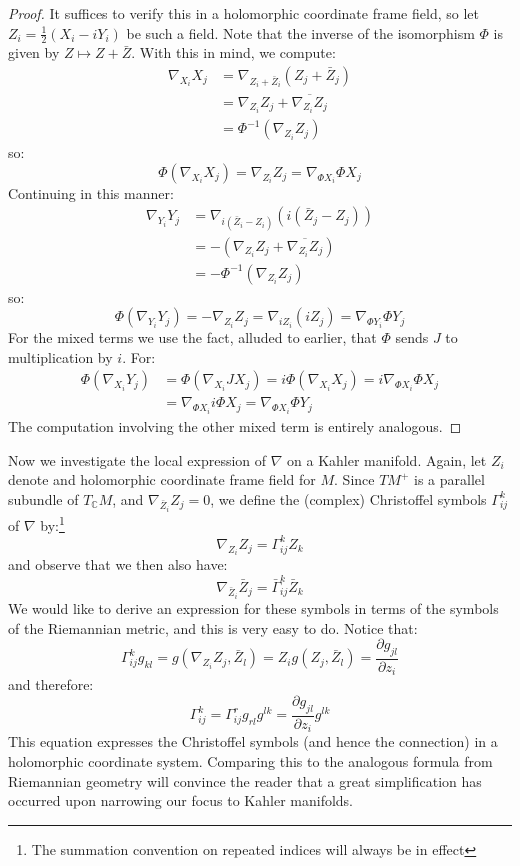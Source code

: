 \documentclass[11pt]{amsart}
\theoremstyle{definition}
\def \C{ \mathbb{C} }
\def \del{ \partial }
\begin{document}
\begin{proof}
%
It suffices to verify this in a holomorphic coordinate frame field, so let $Z_i = \frac{1}{2}(X_i - i Y_i)$ be such a field. Note that the inverse of the isomorphism $\Phi$ is given by $Z \mapsto Z + \bar{Z}$.  With this in mind, we compute:
%
\begin{align*}
\nabla_{X_i} X_j & = \nabla_{Z_i + \bar{Z}_i} ( Z_j + \bar{Z}_j ) \\
&= \nabla_{Z_i} Z_j + \overline{ \nabla_{Z_i} Z_j }\\
&= \Phi^{-1}( \nabla_{Z_i} Z_j )
\end{align*}
%
so:
%
$$ \Phi ( \nabla_{X_i} X_j ) = \nabla_{Z_i} Z_j = \nabla_{ \Phi X_i } \Phi X_j $$
%
Continuing in this manner:
%
\begin{align*}
\nabla_{Y_i} Y_j &= \nabla_{i(\bar{Z}_i - Z_i)} ( i(\bar{Z}_j - Z_j ) ) \\
&= - (\nabla_{Z_i} Z_j + \overline{ \nabla_{Z_i} Z_j } ) \\
&= - \Phi^{-1}( \nabla_{Z_i} Z_j ) 
\end{align*}
%
so:
%
$$ \Phi( \nabla_{Y_i} Y_j ) = -  \nabla_{Z_i} Z_j =  \nabla_{i Z_i}( i Z_j ) = \nabla_{ \Phi Y_i } \Phi Y_j $$
%
For the mixed terms we use the fact, alluded to earlier, that $\Phi$ sends $J$ to multiplication by $i$.  For:
%
\begin{align*}
\Phi( \nabla_{X_i} Y_j ) &= \Phi( \nabla_{X_i} J X_j ) = i \Phi( \nabla_{X_i} X_j ) = i \nabla_{\Phi X_i} \Phi X_j \\
&= \nabla_{\Phi X_i } i \Phi X_j = \nabla_{\Phi X_i} \Phi Y_j 
\end{align*}
%
The computation involving the other mixed term is entirely analogous. 
%
\end{proof}

Now we investigate the local expression of $\nabla$ on a Kahler manifold.  Again, let $Z_i$ denote and holomorphic coordinate frame field for $M$.  Since $TM^{+}$ is a parallel subundle of $T_{\C}M$, and $\nabla_{\bar{Z}_i} Z_j = 0$, we define the (complex) Christoffel symbols $\Gamma_{ij}^k$ of $\nabla$ by:\footnote{The summation convention on repeated indices will always be in effect}
%
$$ \nabla_{Z_i} Z_j = \Gamma_{ij}^k Z_k $$
%
and observe that we then also have:
%
$$ \nabla_{ \bar{Z}_i } \bar{Z}_j = \bar{\Gamma}_{ij}^k \bar{Z}_k $$
%
We would like to derive an expression for these symbols in terms of the symbols of the Riemannian metric, and this is very easy to do.  Notice that:
%
$$ \Gamma_{ij}^k g_{kl} = g( \nabla_{Z_i} Z_j, \bar{Z}_l ) = Z_i g( Z_j, \bar{Z}_l ) = \frac{ \del g_{jl} }{ \del z_i } $$
%
and therefore:
%
$$ \Gamma_{ij}^k = \Gamma_{ij}^r g_{rl} g^{lk} = \frac{ \del g_{jl} }{ \del z_i } g^{lk} $$
%
This equation expresses the Christoffel symbols (and hence the connection) in a holomorphic coordinate system.  Comparing this to the analogous formula from Riemannian geometry will convince the reader that a great simplification has occurred upon narrowing our focus to Kahler manifolds.
\end{document}
